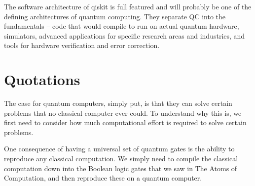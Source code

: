 \documentclass{article}
\begin{document}
The software architecture of qiskit is full featured and will probably be one of the defining architectures of quantum computing. They separate QC into the fundamentals -- code that would compile to run on actual quantum hardware, simulators, advanced applications for specific research areas and industries, and tools for hardware verification and error correction. 

\section{Quotations}
The case for quantum computers, simply put, is that they can solve certain problems that no classical computer ever could. To understand why this is, we first need to consider how much computational effort is required to solve certain problems.

One consequence of having a universal set of quantum gates is the ability to reproduce any classical computation. We simply need to compile the classical computation down into the Boolean logic gates that we saw in The Atoms of Computation, and then reproduce these on a quantum computer.
\end{document}
